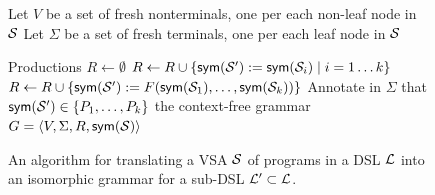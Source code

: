 \begin{figure}[t]
    \centering
    \small
    \begin{algorithmic}[1]
            \State Let $V$ be a set of fresh nonterminals, one per each non-leaf node in $\mathcal{S}$
            \State Let $\Sigma$ be a set of fresh terminals, one per each leaf node in $\mathcal{S}$
            \State {}
            \addtocounter{ALG@line}{-1}
            \WithNumber \State Productions $R \gets \emptyset$
            \State {}
                \State $R \gets R \cup \{ \mathsf{sym}(\mathcal{S}') := \mathsf{sym}(\mathcal{S}_i) \mid i = 1 \dots k \}$
            \EndFor
            \State {}
                \State $R \gets R \cup \{ \mathsf{sym}(\mathcal{S}') := F(\mathsf{sym}(\mathcal{S}_1), \dots, \mathsf{sym}(\mathcal{S}_k)) \}$
            \EndFor
            \State {}
                \State Annotate in $\Sigma$ that $\mathsf{sym}(\mathcal{S}') \in \{ P_1, \dots, P_k \}$
            \EndFor
            \State \Return the context-free grammar $G = \langle V, \Sigma, R, \mathsf{sym}(\mathcal{S})\rangle$
        \EndFunction
    \end{algorithmic}
    \caption{An algorithm for translating a VSA $\mathcal{S}$ of programs in a DSL $\mathcal{L}$ into an isomorphic grammar for a
        sub-DSL $\mathcal{L}' \subset \mathcal{L}$.}
    \label{fig:vsa:incremental}
\end{figure}

